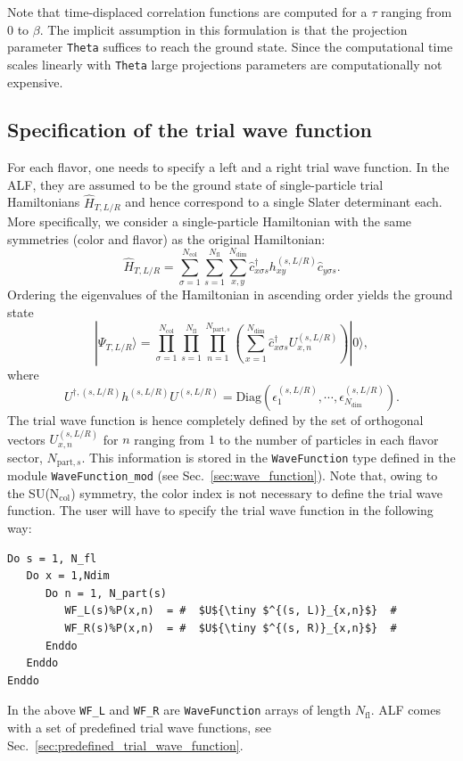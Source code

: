 Note that time-displaced correlation functions  are computed for a $\tau$ ranging from $0$ to $\beta$.  The implicit assumption  in this formulation is that  the projection  parameter  \texttt{Theta}  suffices to reach the ground state.    Since the  computational time scales linearly with  \texttt{Theta}   large projections parameters are computationally not expensive. 


\subsection{Specification of the trial wave function} \label{sec:trial_wave_function}

For each flavor, one needs to specify a left and a right trial wave function. In the ALF, they are assumed to be the ground state of single-particle trial Hamiltonians $\hat{H}_{T, L/R}$ and hence correspond to a single Slater determinant each. More specifically, we consider a single-particle Hamiltonian with the same symmetries (color and flavor) as the original Hamiltonian:
\begin{equation} \label{eq:trial_wave_function}
\hat{H}_{T,L/R} = 
\sum\limits_{\sigma=1}^{N_{\mathrm{col}}}
\sum\limits_{s=1}^{N_{\mathrm{fl}}}
\sum\limits_{x,y}^{N_{\mathrm{dim}}}
\hat{c}^{\dagger}_{x \sigma   s} h_{xy}^{(s, L/R)} \hat{c}^{\phantom\dagger}_{y \sigma s}.
\end{equation}
Ordering the eigenvalues  of the Hamiltonian in ascending order yields the ground state
\begin{equation}
	 | \Psi_{T,L/R} \rangle    =     \prod_{\sigma=1}^{N_{\mathrm{col}}}  \prod_{s=1}^{N_{\mathrm{fl}}}      \prod_{n=1}^{N_{\mathrm{part},s}} 
	 \left( \sum_{x=1}^{N_{\mathrm{dim}}}    \hat{c}^{\dagger}_{x \sigma   s} U^{(s, L/R)}_{x,n} \right) 
	  | 0 \rangle ,
\end{equation} 
where 
\begin{equation}
	U^{\dagger,(s, L/R)}h^{(s, L/R)}  U^{(s, L/R)}   = \mathrm{Diag} \left(   \epsilon_1^{(s, L/R)}, \cdots, \epsilon_{N_{\mathrm{dim}}}^{(s, L/R)} \right).
\end{equation}
The trial wave function is hence  completely defined by the set of orthogonal vectors  $ U^{(s, L/R)}_{x,n} $  for  $ n $ ranging from  $ 1 $ to  the number of particles   in each flavor sector, $N_{\mathrm{part},s}$.  This information  is stored in the \texttt{WaveFunction}  type defined in the module \texttt{WaveFunction\_mod} (see Sec.~\ref{sec:wave_function}).  Note that, owing to the SU(N$_{\mathrm{col}}$) symmetry, the color index is not necessary to define  the trial wave function.  The user will have to specify the trial wave function in the following way:
\begin{lstlisting}[style=fortran,escapechar=\#]
Do s = 1, N_fl
   Do x = 1,Ndim
      Do n = 1, N_part(s)
         WF_L(s)%P(x,n)  = #  $U${\tiny $^{(s, L)}_{x,n}$}  #
         WF_R(s)%P(x,n)  = #  $U${\tiny $^{(s, R)}_{x,n}$}  #
      Enddo
   Enddo
Enddo
\end{lstlisting}
In the above \texttt{WF\_L} and \texttt{WF\_R} are \texttt{WaveFunction} arrays of length $N_{\mathrm{fl}}$. ALF comes with a set of predefined trial wave functions, see Sec.~\ref{sec:predefined_trial_wave_function}.

